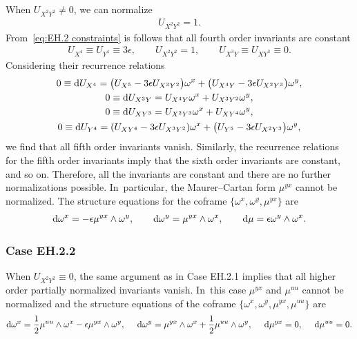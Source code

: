 \documentclass[pdftex]{sigma}%
\numberwithin{equation}{section}
\begin{document}
When $U_{X^2Y^2}\neq 0$, we can normalize
\begin{gather*}
U_{X^2Y^2} =1.
\end{gather*}
From~\eqref{eq:EH.2 constraints} is follows that all fourth order invariants are constant
\begin{gather*}
U_{X^4}\equiv U_{Y^4} \equiv 3\epsilon,\qquad U_{X^2Y^2}=1,\qquad U_{X^3Y}\equiv U_{XY^3}\equiv 0.
\end{gather*}
Considering their recurrence relations
%
\begin{gather*}
0 \equiv {\rm d}U_{X^4} = \big(U_{X^5}-3\epsilon U_{X^3Y^2}\big)\omega^x+\big(U_{X^4Y}-3\epsilon U_{X^2Y^3}\big)\omega^y,\\
%
0 \equiv {\rm d}U_{X^3Y} = U_{X^4Y}\omega^x + U_{X^3Y^2}\omega^y,\\
%
0 \equiv {\rm d}U_{XY^3} = U_{X^2Y^3}\omega^x + U_{XY^4}\omega^y,\\
%
0 \equiv {\rm d}U_{Y^4} = (U_{XY^4} - 3\epsilon U_{X^3Y^2})\omega^x + \big(U_{Y^5}-3\epsilon U_{X^2Y^3}\big)\omega^y,
\end{gather*}
%
we find that all fifth order invariants vanish. Similarly, the recurrence relations for the fifth order invariants imply that the sixth order invariants are constant, and so on. Therefore, all the invariants are constant and there are no further normalizations possible. In~particular, the Maurer--Cartan form $\mu^{yx}$ cannot be normalized. The structure equations for the coframe $\{\omega^x, \omega^y, \mu^{yx}\}$ are
\begin{gather*}
{\rm d}\omega^x = -\epsilon \mu^{yx}\wedge \omega^y,\qquad
{\rm d}\omega^y = \mu^{yx}\wedge \omega^x,\qquad
{\rm d}\mu = \epsilon \omega^y \wedge \omega^x.
\end{gather*}

\subsubsection{Case EH.2.2}

When $U_{X^2Y^2}\equiv 0$, the same argument as in Case EH.2.1 implies that all higher order partially normalized invariants vanish. In~this case $\mu^{yx}$ and $\mu^{uu}$ cannot be normalized and the structure equations of the coframe $\{\omega^x, \omega^y, \mu^{yx}, \mu^{uu}\}$ are
\begin{gather*}
{\rm d}\omega^x = \frac{1}{2} \mu^{uu}\wedge \omega^x - \epsilon \mu^{yx} \wedge \omega^y,\quad\
{\rm d}\omega^y = \mu^{yx} \wedge \omega^x + \frac{1}{2}\mu^{uu}\wedge \omega^y,\quad\
{\rm d}\mu^{yx} = 0,\quad\
{\rm d}\mu^{uu} = 0.
\end{gather*}
\end{document}
